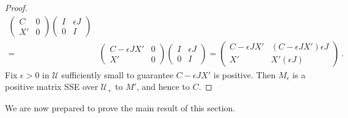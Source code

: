 \documentclass{amsart}
\theoremstyle{definition}
\theoremstyle{remark}
\numberwithin{equation}{section}
\begin{document}
{{\begin{proof}
\begin{align*}
\begin{pmatrix} C & 0 \\  X' & 0 \end{pmatrix} 
\begin{pmatrix} I & \epsilon J  \\ 0 & I \end{pmatrix} \\ 
=& 
\begin{pmatrix} C-\epsilon JX' & 0 \\  X' & 0 \end{pmatrix} 
\begin{pmatrix} I & \epsilon J  \\ 0 & I \end{pmatrix} 
= 
\begin{pmatrix} C-\epsilon JX' & (C-\epsilon JX')\epsilon J
 \\  
X' & X'(\epsilon J) \end{pmatrix} \ . 
\end{align*} 
Fix $\epsilon > 0$ in $\mathcal U$ sufficiently small to 
guarantee 
$C-\epsilon JX'$ is positive. Then 
$M_{\epsilon}$ is a positive matrix SSE over $\mathcal U_+$ to 
$M'$, and hence to $C$. 
\end{proof} 

We are now prepared to prove the main result of this section. 



}}
\end{document}
